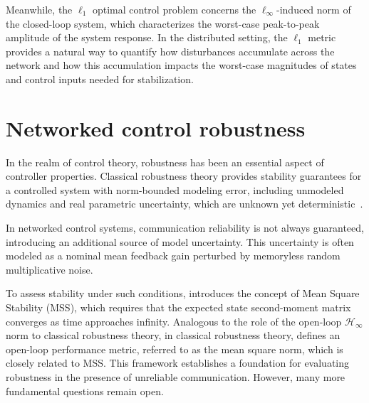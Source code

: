 Meanwhile, the $\ell_1$ optimal control problem concerns the $\ell_\infty$-induced norm of the closed-loop system, which characterizes the worst-case peak-to-peak amplitude of the system response. In the distributed setting, the $\ell_1$ metric provides a natural way to quantify how disturbances accumulate across the network and how this accumulation impacts the worst-case magnitudes of states and control inputs needed for stabilization. 



\section{Networked control robustness}

In the realm of control theory, robustness has been an essential aspect of controller properties. Classical robustness theory provides stability guarantees for a controlled system with norm-bounded modeling error, including unmodeled dynamics and real parametric uncertainty, which are unknown yet deterministic~\cite{Doyle1987UncertainSS, Packard1990QuadStab, packard_mainloop}.

In networked control systems, communication reliability is not always guaranteed, introducing an additional source of model uncertainty. This uncertainty is often modeled as a nominal mean feedback gain perturbed by memoryless random multiplicative noise.

To assess stability under such conditions, \cite{Elia2005stabfading} introduces the concept of Mean Square Stability (MSS), which requires that the expected state second-moment matrix converges as time approaches infinity. Analogous to the role of the open-loop \(\mathcal{H}_\infty\) norm to classical robustness theory, in classical robustness theory, \cite{Elia2005stabfading} defines an open-loop performance metric, referred to as the mean square norm, which is closely related to MSS. This framework establishes a foundation for evaluating robustness in the presence of unreliable communication. However, many more fundamental questions remain open.











